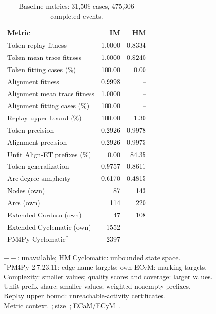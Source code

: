 \begin{table}[htbp]
\centering
\small
\begin{tabular}{lrr}
\toprule
Metric & IM & HM \\
\midrule
Token replay fitness & 1.0000 & 0.8334 \\
Token mean trace fitness & 1.0000 & 0.8240 \\
Token fitting cases (\%) & 100.00 & 0.00 \\
Alignment fitness & 0.9998 & -- \\
Alignment mean trace fitness & 1.0000 & -- \\
Alignment fitting cases (\%) & 100.00 & -- \\
Replay upper bound (\%) & 100.00 & 1.30 \\
Token precision & 0.2926 & 0.9978 \\
Alignment precision & 0.2926 & 0.9975 \\
Unfit Align-ET prefixes (\%) & 0.00 & 84.35 \\
Token generalization & 0.9757 & 0.8611 \\
Arc-degree simplicity & 0.6170 & 0.4815 \\
\midrule
Nodes (own) & 87 & 143 \\
Arcs (own) & 114 & 220 \\
Extended Cardoso (own) & 47 & 108 \\
Extended Cyclomatic (own) & 1552 & -- \\
PM4Py Cyclomatic$^*$ & 2397 & -- \\
\bottomrule
\end{tabular}
\par\smallskip
\begin{minipage}{\linewidth}\scriptsize
$--$: unavailable; HM Cyclomatic: unbounded state space.\\
$^*$PM4Py 2.7.23.11: edge-name targets; own ECyM: marking targets.\\
Complexity: smaller values; quality scores and coverage: larger values.\\
Unfit-prefix share: smaller values; weighted nonempty prefixes.\\
Replay upper bound: unreachable-activity certificates.\\
Metric context~\cite{carmona2018conformance}; size~\cite{pedro2015simplification}; ECaM/ECyM~\cite{lassen2009complexity}.
\end{minipage}
\caption{Baseline metrics: 31,509 cases, 475,306 completed events.}
\label{tab:baseline-quality}
\end{table}
